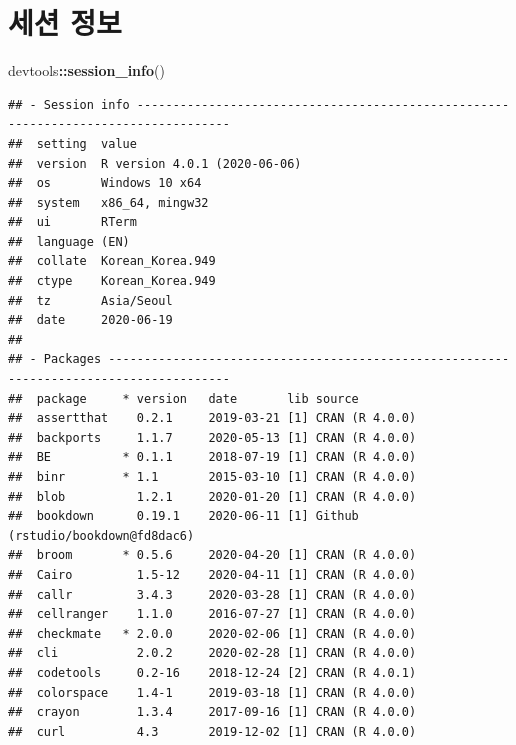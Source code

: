 \documentclass[
  10pt,
]{krantz}
\makeatletter
\newenvironment{Shaded}{\begin{snugshade}}{\end{snugshade}}
\newcommand{\KeywordTok}[1]{\textcolor[rgb]{0.13,0.29,0.53}{\textbf{#1}}}
\newcommand{\NormalTok}[1]{#1}
\newcommand{\OperatorTok}[1]{\textcolor[rgb]{0.81,0.36,0.00}{\textbf{#1}}}
\newenvironment{kframe}{%
\medskip{}
\setlength{\fboxsep}{.8em}
 \def\at@end@of@kframe{}%
 \ifinner\ifhmode%
  \def\at@end@of@kframe{\end{minipage}}%
  \begin{minipage}{\columnwidth}%
 \fi\fi%
 \def\FrameCommand##1{\hskip\@totalleftmargin \hskip-\fboxsep
 \colorbox{shadecolor}{##1}\hskip-\fboxsep
     \hskip-\linewidth \hskip-\@totalleftmargin \hskip\columnwidth}%
 \MakeFramed {\advance\hsize-\width
   \@totalleftmargin\z@ \linewidth\hsize
   \@setminipage}}%
 {\par\unskip\endMakeFramed%
 \at@end@of@kframe}
\renewenvironment{Shaded}{\begin{kframe}}{\end{kframe}}
\makeatother
\begin{document}
\hypertarget{session-info}{%
\chapter{세션 정보}\label{session-info}}

\begin{Shaded}
\begin{Highlighting}[]
\NormalTok{devtools}\OperatorTok{::}\KeywordTok{session\_info}\NormalTok{()}
\end{Highlighting}
\end{Shaded}

\begin{verbatim}
## - Session info -----------------------------------------------------------------------------------
##  setting  value                       
##  version  R version 4.0.1 (2020-06-06)
##  os       Windows 10 x64              
##  system   x86_64, mingw32             
##  ui       RTerm                       
##  language (EN)                        
##  collate  Korean_Korea.949            
##  ctype    Korean_Korea.949            
##  tz       Asia/Seoul                  
##  date     2020-06-19                  
## 
## - Packages ---------------------------------------------------------------------------------------
##  package     * version   date       lib source                           
##  assertthat    0.2.1     2019-03-21 [1] CRAN (R 4.0.0)                   
##  backports     1.1.7     2020-05-13 [1] CRAN (R 4.0.0)                   
##  BE          * 0.1.1     2018-07-19 [1] CRAN (R 4.0.0)                   
##  binr        * 1.1       2015-03-10 [1] CRAN (R 4.0.0)                   
##  blob          1.2.1     2020-01-20 [1] CRAN (R 4.0.0)                   
##  bookdown      0.19.1    2020-06-11 [1] Github (rstudio/bookdown@fd8dac6)
##  broom       * 0.5.6     2020-04-20 [1] CRAN (R 4.0.0)                   
##  Cairo         1.5-12    2020-04-11 [1] CRAN (R 4.0.0)                   
##  callr         3.4.3     2020-03-28 [1] CRAN (R 4.0.0)                   
##  cellranger    1.1.0     2016-07-27 [1] CRAN (R 4.0.0)                   
##  checkmate   * 2.0.0     2020-02-06 [1] CRAN (R 4.0.0)                   
##  cli           2.0.2     2020-02-28 [1] CRAN (R 4.0.0)                   
##  codetools     0.2-16    2018-12-24 [2] CRAN (R 4.0.1)                   
##  colorspace    1.4-1     2019-03-18 [1] CRAN (R 4.0.0)                   
##  crayon        1.3.4     2017-09-16 [1] CRAN (R 4.0.0)                   
##  curl          4.3       2019-12-02 [1] CRAN (R 4.0.0)                   

\end{verbatim}
\end{document}
